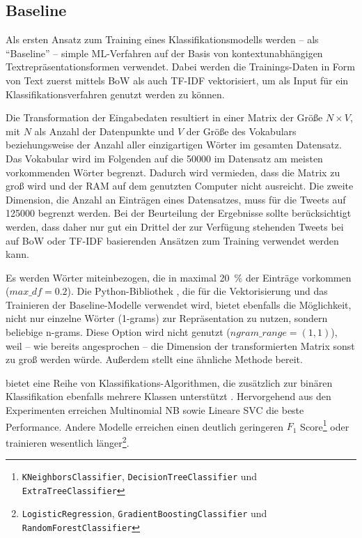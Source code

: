 \subsection{Baseline} \label{subsec:baseline}

Als ersten Ansatz zum Training eines Klassifikationsmodells werden -- als \enquote{Baseline} -- simple \ac{ML}-Verfahren auf der Basis von kontextunabhängigen Textrepräsentationsformen verwendet. Dabei werden die Trainings-Daten in Form von Text zuerst mittels \ac{BoW} als auch \ac{TF-IDF} vektorisiert, um als Input für ein Klassifikationsverfahren genutzt werden zu können.

Die Transformation der Eingabedaten resultiert in einer Matrix der Größe \(N \times V\), mit \(N\) als Anzahl der Datenpunkte und \(V\) der Größe des Vokabulars beziehungsweise der Anzahl aller einzigartigen Wörter im gesamten Datensatz. Das Vokabular wird im Folgenden auf die \num{50000} im Datensatz am meisten vorkommenden Wörter begrenzt. Dadurch wird vermieden, dass die Matrix zu groß wird und der \ac{RAM} auf dem genutzten Computer nicht ausreicht. Die zweite Dimension, die Anzahl an Einträgen eines Datensatzes, muss für die Tweets auf \num{125000} begrenzt werden. Bei der Beurteilung der Ergebnisse sollte berücksichtigt werden, dass daher nur gut ein Drittel der zur Verfügung stehenden Tweets bei auf \ac{BoW} oder \ac{TF-IDF} basierenden Ansätzen zum Training verwendet werden kann.

Es werden Wörter miteinbezogen, die in maximal \SI{20}{\percent} der Einträge vorkommen (\(max\_df = \num{0.2}\)). Die Python-Bibliothek \sk, die für die Vektorisierung und das Trainieren der Baseline-Modelle verwendet wird, bietet ebenfalls die Möglichkeit, nicht nur einzelne Wörter (1-grams) zur Repräsentation zu nutzen, sondern beliebige n-grams. Diese Option wird nicht genutzt (\(ngram\_range = (\num{1}, \num{1})\)), weil -- wie bereits angesprochen -- die Dimension der transformierten Matrix sonst zu groß werden würde. Außerdem stellt \ft eine ähnliche Methode bereit.

\sk bietet eine Reihe von Klassifikations-Algorithmen, die zusätzlich zur binären Klassifikation ebenfalls mehrere Klassen unterstützt \autocite{noauthor_112_nodate}. Hervorgehend aus den Experimenten erreichen Multinomial \ac{NB} sowie Lineare \ac{SVC} die beste Performance. Andere Modelle erreichen einen deutlich geringeren \(F_1\) Score\footnote{\texttt{KNeighborsClassifier}, \texttt{DecisionTreeClassifier} und \texttt{ExtraTreeClassifier}} oder trainieren wesentlich länger\footnote{\texttt{LogisticRegression}, \texttt{GradientBoostingClassifier} und \texttt{RandomForestClassifier}}.

